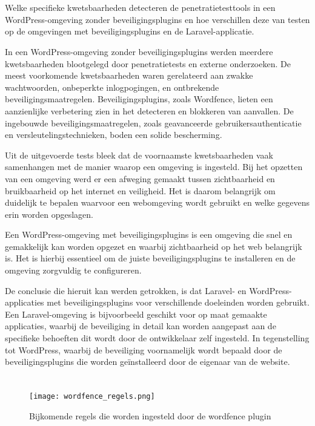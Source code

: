   \section{}  
   Welke specifieke kwetsbaarheden detecteren de penetratietesttools in een WordPress-omgeving zonder beveiligingsplugins en 
   hoe verschillen deze van testen op de omgevingen met beveiligingsplugins en de Laravel-applicatie.
  
  In een WordPress-omgeving zonder beveiligingsplugins werden meerdere kwetsbaarheden blootgelegd door penetratietests en 
  externe onderzoeken. De meest voorkomende kwetsbaarheden waren gerelateerd aan zwakke wachtwoorden, onbeperkte 
  inlogpogingen, en ontbrekende beveiligingsmaatregelen. Beveiligingsplugins, zoals Wordfence, lieten een aanzienlijke 
  verbetering zien in het detecteren en blokkeren van aanvallen. De ingebouwde beveiligingsmaatregelen, zoals geavanceerde 
  gebruikersauthenticatie en versleutelingstechnieken, boden een solide bescherming.

  Uit de uitgevoerde tests bleek dat de voornaamste kwetsbaarheden vaak samenhangen met de manier waarop een omgeving is 
  ingesteld. Bij het opzetten van een omgeving werd er een afweging gemaakt tussen zichtbaarheid en bruikbaarheid op het 
  internet en veiligheid. Het is daarom belangrijk om duidelijk te bepalen waarvoor een webomgeving wordt gebruikt en welke 
  gegevens erin worden opgeslagen.

  Een WordPress-omgeving met beveiligingsplugins is een omgeving die snel en gemakkelijk kan worden opgezet en waarbij 
  zichtbaarheid op het web belangrijk is. Het is hierbij essentieel om de juiste beveiligingsplugins te installeren en de 
  omgeving zorgvuldig te configureren.

  De conclusie die hieruit kan werden getrokken, is dat Laravel- en WordPress-applicaties met beveiligingsplugins voor 
  verschillende doeleinden worden gebruikt. Een Laravel-omgeving is bijvoorbeeld geschikt voor op maat gemaakte applicaties, 
  waarbij de beveiliging in detail kan worden aangepast aan de specifieke behoeften dit wordt door de ontwikkelaar zelf 
  ingesteld. In tegenstelling tot WordPress, waarbij de beveiliging voornamelijk wordt bepaald door de beveiligingsplugins 
  die worden geïnstalleerd door de eigenaar van de website.

  \section{}  
  \begin{figure}
    \centering
    \texttt{[image: wordfence\_regels.png]}
    \caption[Bijkomende regels die worden ingesteld door de wordfence plugin]{Bijkomende regels die worden ingesteld door de wordfence plugin}
    \label{fig:wordfence_regels}
  \end{figure}

